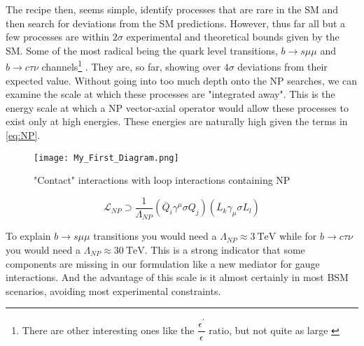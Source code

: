 
The recipe then, seems simple, identify processes that are rare in the SM and then search for deviations from the SM predictions. However, thus far all but a few processes are within $2\sigma$ experimental and theoretical bounds given by the SM. 
%
Some of the most radical being the quark level transitions, $b \rightarrow s \mu \mu$ \cite{DAmico2017,Geng_2017} and $b \rightarrow c \tau \nu$ channels\footnote{There are other interesting ones like the $\dfrac{\epsilon^\prime}{\epsilon}$ ratio, but not quite as large \cite{Buras2015}} \cite{Fajfer_2012}. 
%
They are, so far, showing over $ 4 \sigma$ deviations from their expected value. 
%
Without going into too much depth onto the NP searches, we can examine the scale at which these processes are "integrated away". This is the energy scale at which a NP vector-axial operator would allow these processes to exist only at high energies. These energies are naturally high given the terms in \ref{eq:NP}. 
%
\bigbreak
%
\noindent\begin{minipage}{.3\textwidth}
	\begin{figure}[H]
		\label{fig:contactNP}
		\centering
		\texttt{[image: My\_First\_Diagram.png]}
		\caption{"Contact" interactions with loop interactions containing NP}
	\end{figure}
\end{minipage}
\begin{minipage}{.6\textwidth}
\begin{equation}
\label{eq:NP}
\mathcal{L}_{NP} \supset \frac{1}{\Lambda_{NP}} (\overline{Q}_i \gamma^\mu \sigma Q_j ) (\overline{L}_k \gamma_\mu \sigma L_l) 
\end{equation}
\end{minipage}
%
\bigbreak
%
To explain $b \rightarrow s \mu \mu$ transitions you would need a $\Lambda_{NP} \approx 3 \ \text{TeV}$ while for $b \rightarrow c \tau \nu$ you would need a $\Lambda_{NP} \approx 30\ \text{TeV}$. This is a strong indicator that some components are missing in our formulation like a new mediator for gauge interactions. And the advantage of this scale is it almost certainly in most BSM scenarios, avoiding most experimental constraints.


